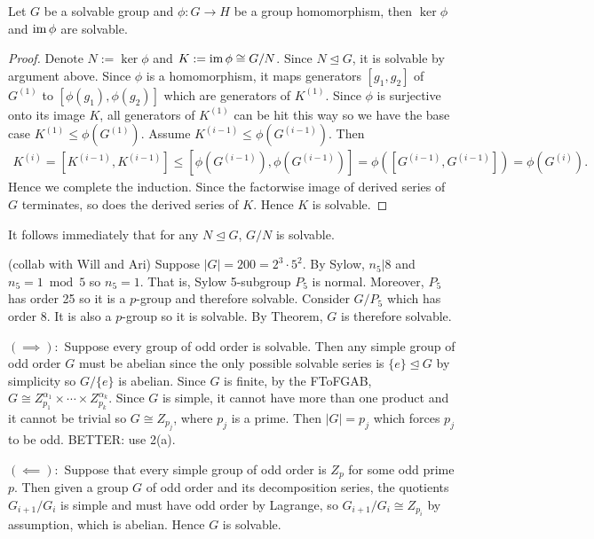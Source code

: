 \documentclass[12pt]{article}
\begin{document}
\begin{problem}[2]
\begin{enumerate}[label=(\alph*)]
\begin{prop}
Let $ G$ be a solvable group and $ \phi:G \to H$ be a group homomorphism, then $\ker \phi$ and $ \operatorname{im} \phi$ are solvable.
\end{prop}
\begin{proof}
	Denote $ N:= \ker \phi$ and $K:= \operatorname{im} \phi \cong G /N$. Since $N \trianglelefteq G $, it is solvable by argument above. Since $ \phi$ is a homomorphism, it maps generators $ [g_1,g_2]$ of $ G^{(1)}$ to $[\phi(g_1),\phi(g_2)]$ which are generators of $ K^{(1)}$. Since $ \phi$ is surjective onto its image $ K$, all generators of $ K^{(1)}$ can be hit this way so we have the base case $K^{(1)} \leq \phi(G^{(1)})$. Assume $ K^{(i-1)} \leq \phi (G^{(i-1)})$. Then
	\begin{align*}
		K^{(i)} = [K^{(i-1)},K^{(i-1)}] \leq [\phi(G^{(i-1)}),\phi(G^{(i-1)})] = \phi([G^{(i-1)},G^{(i-1)}]) = \phi (G^{(i)}).
	\end{align*}
	Hence we complete the induction. Since the factorwise image of derived series of $ G$ terminates, so does the derived series of $ K$. Hence  $ K$ is solvable.
\end{proof}
It follows immediately that for any $ N \trianglelefteq G$, $ G /N$ is solvable.
\end{enumerate}
\end{problem}
\begin{problem}[3]
	(collab with Will and Ari) Suppose  $ |G| = 200 = 2^3 \cdot 5^2$. By Sylow, $ n_5 | 8$ and $ n_5 = 1 \bmod 5$ so $ n_5 = 1$. That is, Sylow 5-subgroup $ P_5$ is normal. Moreover, $ P_5$ has order 25 so it is a  $ p$-group and therefore solvable. Consider $ G / P_5$ which has order $ 8$. It is also a $ p$-group so it is solvable.  By Theorem, $ G$ is therefore solvable.
\end{problem}
\begin{problem}[4]
$ (\implies):$ Suppose every group of odd order is solvable. Then any simple group of odd order $ G$ must be abelian since the only possible solvable series is $ \{e\} \trianglelefteq G $ by simplicity so $ G / \{e\} $ is abelian. Since $ G$ is finite, by the FToFGAB,  $ G \cong Z_{p_1}^{ \alpha_1} \times \cdots \times Z_{p_k}^{ \alpha_k}$. Since $ G$ is simple, it cannot have more than one product and it cannot be trivial so  $ G \cong Z_{p_j}$, where $ p_j$ is a prime. Then $ |G| = p_j$ which forces $ p_j$ to be odd.
BETTER: use 2(a).

$ (\impliedby):$ Suppose that every simple group of odd order is $ Z_p$ for some odd prime  $ p$. Then given a group  $ G$ of odd order and its decomposition series, the quotients  $ G_{i+1} / G_i$ is simple and must have odd order by Lagrange, so $ G_{i+1} / G_i \cong Z_{p_i}$ by assumption, which is abelian. Hence $ G$ is solvable.
\end{problem}
\end{document}
